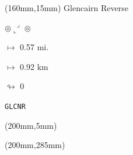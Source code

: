 \begin{textblock*}{40mm}(160mm,15mm)%
Glencairn Reverse
\par $\circledcirc\llcorner^{\rightthreetimes}\circledcirc$
\Large
\par$\mapsto$ 0.57 mi.
\par$\mapsto$ 0.92 km
\par$\looparrowright$ 0
\par\hfill\tiny\tt GLCNR\\
\end{textblock*}
\begin{textblock*}{20mm}(200mm,5mm)%
\fbox{\thepage}
\end{textblock*}
\begin{textblock*}{20mm}(200mm,285mm)%
\fbox{\thepage}
\end{textblock*}
\null\newpage

